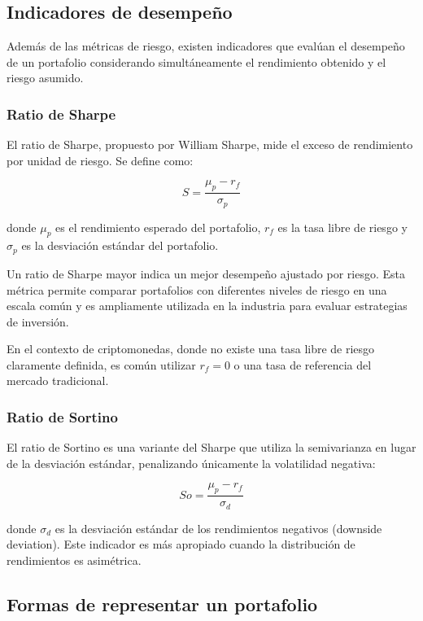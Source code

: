 \subsection{Indicadores de desempeño}

Además de las métricas de riesgo, existen indicadores que evalúan el
desempeño de un portafolio considerando simultáneamente el
rendimiento obtenido y el riesgo asumido.

\subsubsection{Ratio de Sharpe}

El ratio de Sharpe, propuesto por William Sharpe, mide el exceso de
rendimiento por unidad de riesgo. Se define como:

\begin{equation}
  S = \frac{\mu_p - r_f}{\sigma_p}
\end{equation}

donde $\mu_p$ es el rendimiento esperado del portafolio, $r_f$ es la
tasa libre de riesgo y $\sigma_p$ es la desviación estándar del
portafolio.

Un ratio de Sharpe mayor indica un mejor desempeño ajustado por
riesgo. Esta métrica permite comparar portafolios con diferentes
niveles de riesgo en una escala común y es ampliamente utilizada
en la industria para evaluar estrategias de inversión.

En el contexto de criptomonedas, donde no existe una tasa libre de
riesgo claramente definida, es común utilizar $r_f = 0$ o una
tasa de referencia del mercado tradicional.

\subsubsection{Ratio de Sortino}

El ratio de Sortino es una variante del Sharpe que utiliza la
semivarianza en lugar de la desviación estándar, penalizando
únicamente la volatilidad negativa:

\begin{equation}
  So = \frac{\mu_p - r_f}{\sigma_d}
\end{equation}

donde $\sigma_d$ es la desviación estándar de los rendimientos
negativos (downside deviation). Este indicador es más apropiado
cuando la distribución de rendimientos es asimétrica.

\subsection{Formas de representar un portafolio}

